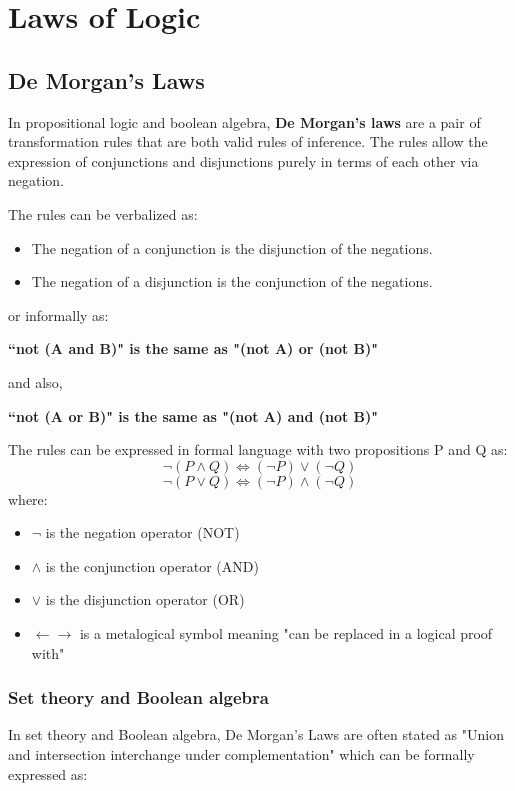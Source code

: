 \documentclass[12pt]{report}
\begin{document}
\section*{Laws of Logic}

\subsection*{De Morgan's Laws}

In propositional logic and boolean algebra, \textbf{De Morgan's laws} are a pair of transformation rules that are both valid rules of inference. The rules allow the expression of conjunctions and disjunctions purely in terms of each other via negation.

\noindent The rules can be verbalized as:

\begin{itemize}
\item The negation of a conjunction is the disjunction of the negations.
\item The negation of a disjunction is the conjunction of the negations.
\end{itemize}
or informally as:
\begin{center}
\textbf{``not (A and B)" is the same as "(not A) or (not B)"
}
\end{center}

and also,
\begin{center}
\textbf{``not (A or B)" is the same as "(not A) and (not B)"
}
\end{center}
The rules can be expressed in formal language with two propositions P and Q as:
\[ \neg(P\land Q)\iff(\neg P)\lor(\neg Q)\]
\[\neg(P\lor Q)\iff(\neg P)\land(\neg Q)\]
where:
\begin{itemize}
\item $\neg$ is the negation operator (NOT)
\item $\wedge $ is the conjunction operator (AND)
\item $\vee$ is the disjunction operator (OR)
\item $\leftarrow \rightarrow$ is a metalogical symbol meaning "can be replaced in a logical proof with"
\end{itemize}

\subsubsection{Set theory and Boolean algebra}
In set theory and Boolean algebra, De Morgan's Laws are often stated as "Union and intersection interchange under complementation" which can be formally expressed as:
\end{document}
